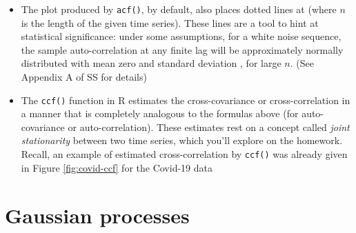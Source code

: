 \documentclass{article}
\begin{document}
\begin{itemize}
\item The plot produced by \verb|acf()|, by default, also places dotted lines 
  at  (where $n$ is the length of the given time
  series). These lines are a tool to hint at statistical significance: under
  some assumptions, for a white noise sequence, the sample auto-correlation at
  any finite lag will be approximately normally distributed with mean zero and
  standard deviation , for large $n$. (See Appendix A of SS
  for details)  

\item The \verb|ccf()| function in R estimates the cross-covariance or
  cross-correlation in a manner that is completely analogous to the formulas
  above (for auto-covariance or auto-correlation). These estimates rest on a
  concept called \emph{joint stationarity} between two time series, which you'll
  explore on the homework. Recall, an example of estimated cross-correlation by 
  \verb|ccf()| was already given in Figure \ref{fig:covid-ccf} for the Covid-19
  data  
\end{itemize}


\section{Gaussian processes}
\end{document}
